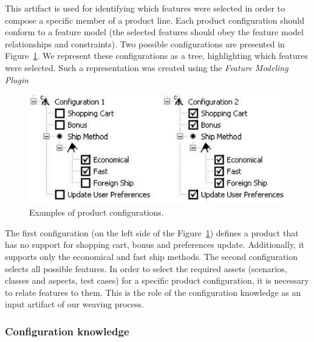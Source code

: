 \documentclass{report}
\begin{document}
\begin{frontmatter}
This artifact is used for identifying which features were selected in order to compose a specific member of a product line. Each product configuration should conform to a feature model (the selected features should obey the feature model relationships and constraints). Two possible configurations are presented in Figure~\ref{fig:product-config-01-02}. We represent these configurations as a tree, highlighting which features were selected. Such a representation was created using the \emph{Feature Modeling Plugin}~\cite{czarnecki-eclipse-2004} 

 \begin{figure}[h]
 \begin{center}
  \includegraphics[scale=0.40]{img/pc-03.eps}
   \nocaptionrule \caption{Examples of product configurations.}
  \label{fig:product-config-01-02}
  \end{center}
\end{figure}

  
The first configuration (on the left side of the Figure~\ref{fig:product-config-01-02}) defines a product that has no support for shopping cart, bonus and preferences update. Additionally, it supports only the economical and fast ship methods. The second configuration selects all possible features. 
In order to select the required assets (scenarios, classes and aspects, test cases) for a specific product configuration, it is necessary to relate features to them. This is the role of the configuration knowledge as an input artifact of our weaving process.  

\subsubsection{Configuration knowledge}\label{subsub:ck}


\end{frontmatter}
\end{document}

